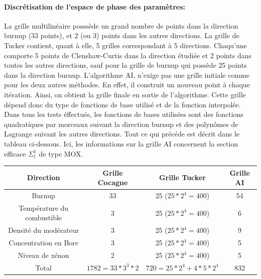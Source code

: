 \paragraph{Discrétisation de l'espace de phase des paramètres:\\}
\hspace{0.5cm} La grille multilinéaire posssède un grand nombre de points dans la direction burnup (33 points), et 2 (ou 3) points
dans les autres directions. La grille de Tucker contient, quant à elle, 5 grilles correspondant à 5 directions.
Chaqu'une comporte 5 points de Clenshaw-Curtis dans la direction étudiée et 2 points dans toutes les autres directions, sauf
pour la grille de burnup qui possède 25 points dans la direction burnup.
L'algorithme AI, n'exige pas une grille initiale comme pour les deux autres méthodes. En effet, il construit
un nouveau point à chaque itération. Ainsi, on obtient la grille finale en sortie de l'algorithme. Cette grille dépend
donc du type de fonctions de base utilisé et de la fonction interpolée.\\
\hspace{0.5cm} Dans tous les tests éffectués, les fonctions de bases utilisées sont des fonctions quadratiques par morceaux suivant la direction burnup et des polynômes de Lagrange suivant les autres directions.
Tout ce qui précéde est décrit dans le tableau ci-dessous. Ici, les informations sur la grille AI concernent la section efficace $\Sigma_t^1$ de type MOX.
\begin{center}
\begin{table}
\begin{tabular}{|*{4}{c|}}
	\hline
	Direction 											& Grille Cocagne  			& Grille Tucker 					 & Grille AI \\
	\hline
	Burnup 			 										& 33 										& 25 ($25*2^4 = 400$) 		 & 	54				\\
	\hline
	Température du combustible			& 3 										& 25 ($25*2^4 = 400$)			 & 	6				 	\\
	\hline
	Densité du modérateur				 		& 3											& 25 ($25*2^4 = 400$) 		 & 	9				\\
	\hline
	Concentration en Bore						& 3 										& 25 ($25*2^4 = 400$)			 & 	5				\\
	\hline
	Niveau de xénon									& 2 										& 25 ($25*2^4 = 400$)			 & 	5				 	\\
	\hline
	Total														& $1782 = 33 * 3^3 * 2$	& $720 = 25*2^4 + 4*5*2^4$ & 	832				 	\\
	\hline
\end{tabular}
\label{table:discretisation}
\end{table}
\end{center}
